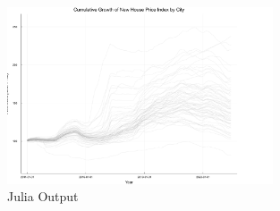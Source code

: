 \documentclass[12pt,letterpaper]{article}
\begin{document}
\begin{figure}[htbp]
	\begin{minipage}{\textwidth}
		\centering
		\includegraphics[width=0.7\textwidth]{PS6c_Gao.png}
		\caption{Julia Output}
	\end{minipage}

\end{figure}
	
	

	
	
	
\end{document}
